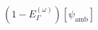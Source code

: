 \documentclass[preview]{standalone}
\begin{document}
\begin{align*}
(1-E_{\Gamma}^{(\omega)})[{\psi}_{\text{amb}}]
\end{align*}
\end{document}
